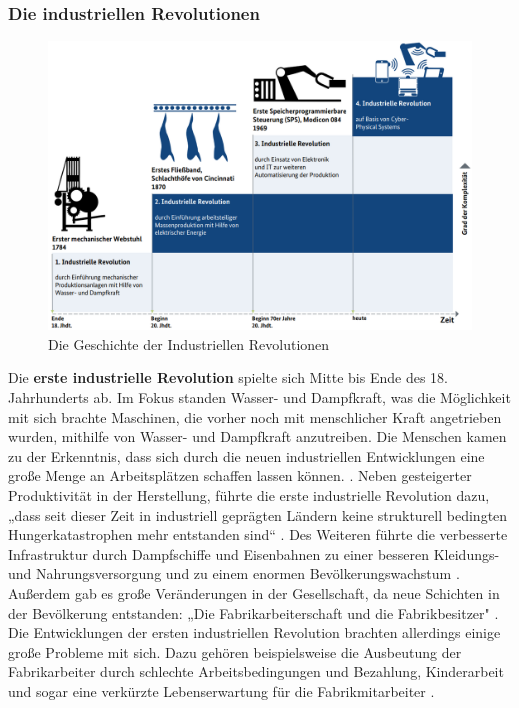 \subsubsection{Die industriellen Revolutionen}\label{sec:IndustrielleRevolution}
\begin{figure}[h]
	\centering
	\includegraphics[width=1\linewidth]{Bilder/A1_DieGeschichteDerIndustriellenRevolutionenBMWI}
	\caption{Die Geschichte der Industriellen Revolutionen \cite[S.8]{A1}}
	\label{fig:IndustrielleRevolutionenBild}
\end{figure}
\FloatBarrier
\noindent Die \textbf{erste industrielle Revolution} spielte sich Mitte bis Ende des 18. Jahrhunderts ab. Im Fokus standen Wasser- und Dampfkraft, was die Möglichkeit mit sich brachte Maschinen, die vorher noch mit menschlicher Kraft angetrieben wurden, mithilfe von Wasser- und Dampfkraft anzutreiben. Die Menschen kamen zu der Erkenntnis, dass sich durch die neuen industriellen Entwicklungen eine große Menge an Arbeitsplätzen schaffen lassen können. \cite{9}. Neben gesteigerter Produktivität in der Herstellung, führte die erste industrielle Revolution dazu, „dass seit dieser Zeit in industriell geprägten Ländern keine strukturell bedingten Hungerkatastrophen mehr entstanden sind“ \cite[S.5]{15}. Des Weiteren führte die verbesserte Infrastruktur durch Dampfschiffe und Eisenbahnen zu einer besseren Kleidungs- und Nahrungsversorgung und zu einem enormen Bevölkerungswachstum \cite[S.5]{15}. Außerdem gab es große Veränderungen in der Gesellschaft, da neue Schichten in der Bevölkerung entstanden: „Die Fabrikarbeiterschaft und die Fabrikbesitzer" \cite[S.5]{15}. Die Entwicklungen der ersten industriellen Revolution brachten allerdings einige große Probleme mit sich. Dazu gehören beispielsweise die Ausbeutung der Fabrikarbeiter durch schlechte Arbeitsbedingungen und Bezahlung, Kinderarbeit und sogar eine verkürzte Lebenserwartung für die Fabrikmitarbeiter \cite[S.5]{15}.
